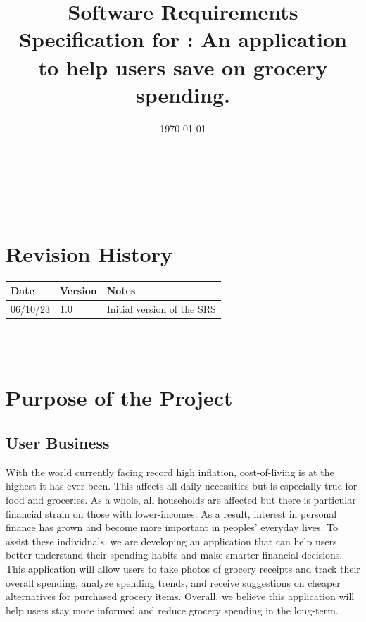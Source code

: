 \documentclass[12pt]{article}
\begin{document}
\title{Software Requirements Specification for \progname: An application to help users save on grocery spending.} 
\author{\authname}
\date{\today}
	
\maketitle

~\newpage


\tableofcontents

~\newpage

\section*{Revision History}

\begin{tabularx}{\textwidth}{p{3cm}p{2cm}X}
\toprule {\textbf{Date}} & {\textbf{Version}} & {\textbf{Notes}}\\
\midrule
06/10/23 & 1.0 & Initial version of the SRS\\
\bottomrule
\end{tabularx}

~\\

~\newpage
\section{Purpose of the Project}
\subsection{User Business}

With the world currently facing record high inflation, cost-of-living is at the highest
it has ever been. This affects all daily necessities but is especially true for food and groceries.
As a whole, all households are affected but there is particular financial strain on those with lower-incomes.
As a result, interest in personal finance has grown and become more important in peoples' everyday lives.
To assist these individuals, we are developing an application that can help users better understand their
spending habits and make smarter financial decisions. This application will allow users to
take photos of grocery receipts and track their overall spending, analyze spending trends, and receive
suggestions on cheaper alternatives for purchased grocery items. Overall, we believe this application
will help users stay more informed and reduce grocery spending in the long-term.
\end{document}
